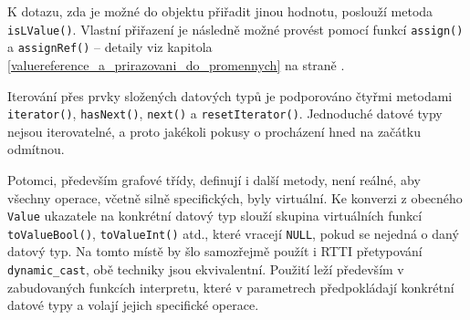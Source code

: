 \documentclass[11pt,twoside,a4paper]{book}
\begin{document}


K dotazu, zda je možné do objektu přiřadit jinou hodnotu, poslouží metoda \texttt{isLValue()}. Vlastní přiřazení je následně možné provést pomocí funkcí \texttt{assign()} a \texttt{assignRef()} -- detaily viz kapitola \ref{valuereference_a_prirazovani_do_promennych} na straně \pageref{valuereference_a_prirazovani_do_promennych}.

Iterování přes prvky složených datových typů je podporováno čtyřmi metodami \texttt{iterator()}, \texttt{hasNext()}, \texttt{next()} a \texttt{resetIterator()}. Jednoduché datové typy nejsou iterovatelné, a proto jakékoli pokusy o procházení hned na začátku odmítnou.

Potomci, především grafové třídy, definují i další metody, není reálné, aby všechny operace, včetně silně specifických, byly virtuální. Ke konverzi z obecného \texttt{Value} ukazatele na konkrétní datový typ slouží skupina virtuálních funkcí \texttt{toValueBool()}, \texttt{toValueInt()} atd., které vracejí \texttt{NULL}, pokud se nejedná o daný datový typ. Na tomto místě by šlo samozřejmě použít i RTTI přetypování \texttt{dynamic\_cast}, obě techniky jsou ekvivalentní. Použití leží především v zabudovaných funkcích interpretu, které v parametrech předpokládají konkrétní datové typy a volají jejich specifické operace.
\end{document}
